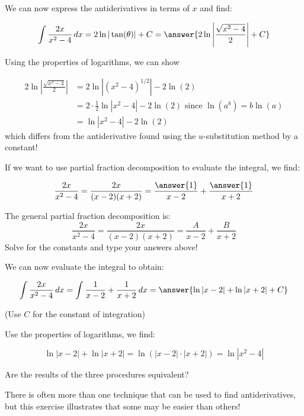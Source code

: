\documentclass{ximera}
\begin{document}
\begin{exercise}
\begin{exercise}
\begin{exercise}
\begin{exercise}
\begin{exercise}
We can now express the antiderivatives in terms of $x$ and find:

\[
\int \frac{2x}{x^2-4} \d x =  2 \ln|\tan(\theta)|+C = \answer{2 \ln \left| \frac{\sqrt{x^2-4}}{2} \right| +C}
\]

\begin{exercise}
Using the properties of logarithms, we can show

\begin{align*}
2 \ln \left| \frac{ \sqrt{x^2-4} }{2} \right| & = 2 \ln \left|(x^2-4)^{1/2} \right| - 2 \ln(2) \\
& = 2 \cdot \frac{1}{2} \ln \left| x^2-4 \right| - 2 \ln(2) \textrm{ since } \ln\left(a^b\right) = b \ln(a) \\
& =  \ln \left|x^2-4 \right| - 2 \ln(2)
\end{align*}
which differs from the antiderivative found using the $u$-substitution method by a constant!

\end{exercise}
\end{exercise}
\end{exercise}
\end{exercise}
\end{exercise}


If we want to use partial fraction decomposition to evaluate the integral, we find:

\[
\frac{2x}{x^2-4} = \frac{2x}{(x-2)(x+2)} = \frac{\answer{1}}{x-2}+\frac{\answer{1}}{x+2}
\]
\begin{hint}
The general partial fraction decomposition is:
\[
\frac{2x}{x^2-4} = \frac{2x}{(x-2)(x+2)} = \frac{A}{x-2}+\frac{B}{x+2}
\]
Solve for the constants and type your answers above!
\end{hint}

\begin{exercise}
We can now evaluate the integral to obtain:

\[
\int \frac{2x}{x^2-4} \d x = \int \frac{1}{x-2}+\frac{1}{x+2} \d x = \answer{\ln|x-2| + \ln|x+2|+C}
\]
 
(Use $C$ for the constant of integration)

\begin{exercise}
Use the properties of logarithms, we find:

\[ \ln|x-2| + \ln|x+2| = \ln \left( |x-2| \cdot |x+2|  \right) = \ln \left| x^2-4  \right| \]
\end{exercise}
\end{exercise}

\begin{exercise}
Are the results of the three procedures equivalent?
\begin{multipleChoice}
\end{multipleChoice}
There is often more than one technique that can be used to find antiderivatives, but this exercise illustrates that some may be easier than others!
\end{exercise}
\end{exercise}
\end{document}

